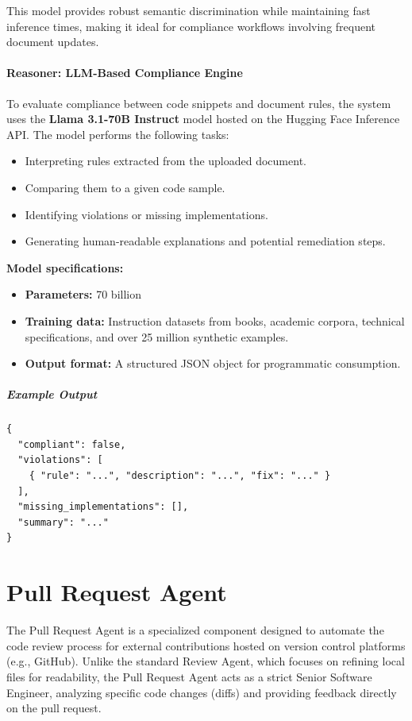 \documentclass[12pt,a4paper]{article}
\begin{document}
This model provides robust semantic discrimination while maintaining fast inference times, making it ideal for compliance workflows involving frequent document updates.

\paragraph{Reasoner: LLM-Based Compliance Engine}

To evaluate compliance between code snippets and document rules, the system uses the \textbf{Llama 3.1-70B Instruct} model hosted on the Hugging Face Inference API. The model performs the following tasks:

\begin{itemize}
    \item Interpreting rules extracted from the uploaded document.
    \item Comparing them to a given code sample.
    \item Identifying violations or missing implementations.
    \item Generating human-readable explanations and potential remediation steps.
\end{itemize}

\textbf{Model specifications:}
\begin{itemize}
    \item \textbf{Parameters:} 70 billion
    \item \textbf{Training data:} Instruction datasets from books, academic corpora, technical specifications, and over 25 million synthetic examples.
    \item \textbf{Output format:} A structured JSON object for programmatic consumption.
\end{itemize}

\subparagraph{Example Output}

\begin{verbatim}
{
  "compliant": false,
  "violations": [
    { "rule": "...", "description": "...", "fix": "..." }
  ],
  "missing_implementations": [],
  "summary": "..."
}
\end{verbatim}

\section{Pull Request Agent}

The Pull Request Agent is a specialized component designed to automate the code review process for external contributions hosted on version control platforms (e.g., GitHub). Unlike the standard Review Agent, which focuses on refining local files for readability, the Pull Request Agent acts as a strict Senior Software Engineer, analyzing specific code changes (diffs) and providing feedback directly on the pull request.
\end{document}
